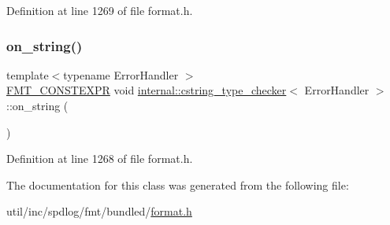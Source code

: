 Definition at line 1269 of file format.\+h.

\mbox{\label{classinternal_1_1cstring__type__checker_abf4cc18d281faa1e7974f1dbba95dd98}} 
\subsubsection{\texorpdfstring{on\+\_\+string()}{on\_string()}}
{\footnotesize\ttfamily template$<$typename Error\+Handler $>$ \\
\hyperlink{core_8h_a69201cb276383873487bf68b4ef8b4cd}{F\+M\+T\+\_\+\+C\+O\+N\+S\+T\+E\+X\+PR} void \hyperlink{classinternal_1_1cstring__type__checker}{internal\+::cstring\+\_\+type\+\_\+checker}$<$ Error\+Handler $>$\+::on\+\_\+string (\begin{DoxyParamCaption}{ }\end{DoxyParamCaption})\hspace{0.3cm}{\ttfamily [inline]}}



Definition at line 1268 of file format.\+h.



The documentation for this class was generated from the following file\+:\begin{DoxyCompactItemize}
\item 
util/inc/spdlog/fmt/bundled/\hyperlink{format_8h}{format.\+h}\end{DoxyCompactItemize}
